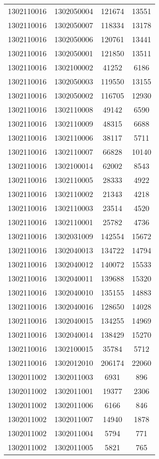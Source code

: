 \begin{longtable}[h]{llcc}
		1302110016 & 1302050004 & 121674 & 13551\\
		1302110016 & 1302050007 & 118334 & 13178\\
		1302110016 & 1302050006 & 120761 & 13441\\
		1302110016 & 1302050001 & 121850 & 13511\\
		1302110016 & 1302100002 & 41252 & 6186\\
		1302110016 & 1302050003 & 119550 & 13155\\
		1302110016 & 1302050002 & 116705 & 12930\\
		1302110016 & 1302110008 & 49142 & 6590\\
		1302110016 & 1302110009 & 48315 & 6688\\
		1302110016 & 1302110006 & 38117 & 5711\\
		1302110016 & 1302110007 & 66828 & 10140\\
		1302110016 & 1302100014 & 62002 & 8543\\
		1302110016 & 1302110005 & 28333 & 4922\\
		1302110016 & 1302110002 & 21343 & 4218\\
		1302110016 & 1302110003 & 23514 & 4520\\
		1302110016 & 1302110001 & 25782 & 4736\\
		1302110016 & 1302031009 & 142554 & 15672\\
		1302110016 & 1302040013 & 134722 & 14794\\
		1302110016 & 1302040012 & 140072 & 15533\\
		1302110016 & 1302040011 & 139688 & 15320\\
		1302110016 & 1302040010 & 135155 & 14883\\
		1302110016 & 1302040016 & 128650 & 14028\\
		1302110016 & 1302040015 & 134255 & 14969\\
		1302110016 & 1302040014 & 138429 & 15270\\
		1302110016 & 1302100015 & 35784 & 5712\\
		1302110016 & 1302012010 & 206174 & 22060\\
		1302011002 & 1302011003 & 6931 & 896\\
		1302011002 & 1302011001 & 19377 & 2306\\
		1302011002 & 1302011006 & 6166 & 846\\
		1302011002 & 1302011007 & 14940 & 1878\\
		1302011002 & 1302011004 & 5794 & 771\\
		1302011002 & 1302011005 & 5821 & 765\\

\end{longtable}
